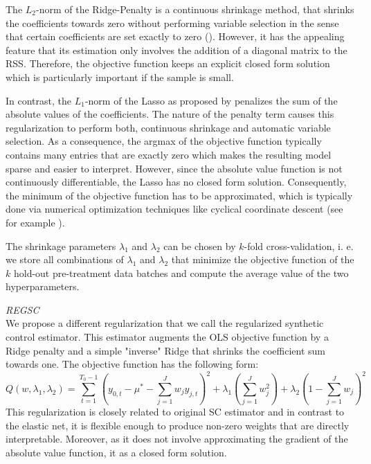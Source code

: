 The $L_2$-norm of the Ridge-Penalty is a continuous shrinkage method, that shrinks the coefficients towards zero without performing variable selection in the sense that certain coefficients are set exactly to zero (\cite{hoerl:1970}). However, it has the appealing feature that its estimation only involves the addition of a diagonal matrix to the \ac{RSS}. Therefore, the objective function keeps an explicit closed form solution which is particularly important if the sample is small.

In contrast, the $L_1$-norm of the Lasso as proposed by \cite{tibshirani:1996} penalizes the sum of the absolute values of the coefficients. The nature of the penalty term causes this regularization to perform both, continuous shrinkage and automatic variable selection. As a consequence, the argmax of the objective function typically contains many entries that are exactly zero which makes the resulting model sparse and easier to interpret. However, since the absolute value function is not continuously differentiable, the Lasso has no closed form solution. Consequently, the minimum of the objective function has to be approximated, which is typically done via numerical optimization techniques like cyclical coordinate descent (see for example \cite{friedman:2010}).

The shrinkage parameters $\lambda_1$ and $\lambda_2$ can be chosen by $k$-fold cross-validation, i. e. we store all combinations of $\lambda_1$ and $\lambda_2$ that minimize the objective function of the $k$ hold-out pre-treatment data batches and compute the average value of the two hyperparameters.

\textit{\ac{REGSC}} \\
We propose a different regularization that we call the regularized synthetic control estimator. This estimator augments the \ac{OLS} objective function by a Ridge penalty and a simple "inverse" Ridge that shrinks the coefficient sum towards one. The objective function has the following form:
\begin{equation*}
	Q(w, \lambda_1, \lambda_2) = \sum_{t=1}^{T_0-1}\left(y_{0,t} - \mu^* - \sum_{j = 1}^{J} w_j y_{j,t} \right)^2 + 
	\lambda_1 \left( \sum_{j = 1}^{J} w_j^2 \right) + 
	\lambda_2 \left(1- \sum_{j = 1}^{J} w_j
	\right)^2  
\end{equation*}
This regularization is closely related to original \ac{SC} estimator and in contrast to the elastic net, it is flexible enough to produce non-zero weights that are directly interpretable. Moreover, as it does not involve approximating the gradient of the absolute value function, it as a closed form solution. 

